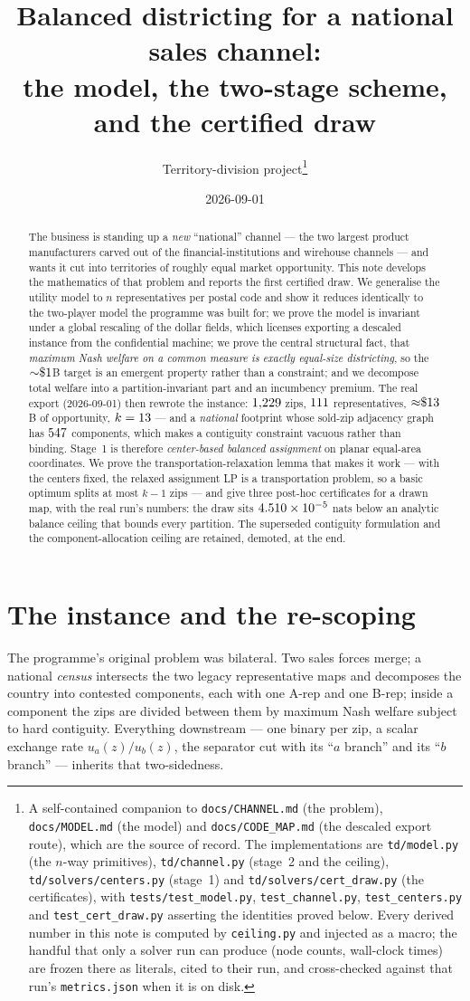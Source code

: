 \documentclass[11pt]{article}
\title{Balanced districting for a national sales channel:\\
the model, the two-stage scheme, and the certified draw}
\author{Territory-division project\thanks{A self-contained companion to
\texttt{docs/CHANNEL.md} (the problem), \texttt{docs/MODEL.md} (the model) and
\texttt{docs/CODE_MAP.md} (the descaled export route), which are the source of record. The
implementations are \texttt{td/model.py} (the $n$-way primitives), \texttt{td/channel.py}
(stage~2 and the ceiling), \texttt{td/solvers/centers.py} (stage~1) and
\texttt{td/solvers/cert\_draw.py} (the certificates), with \texttt{tests/test\_model.py},
\texttt{test\_channel.py}, \texttt{test\_centers.py} and \texttt{test\_cert\_draw.py}
asserting the identities proved below. Every derived number in this note is computed by
\texttt{ceiling.py} and injected as a macro; the handful that only a solver run can produce
(node counts, wall-clock times) are frozen there as literals, cited to their run, and
cross-checked against that run's \texttt{metrics.json} when it is on disk.}}
\date{2026-09-01}
\theoremstyle{definition}
\begin{document}
\maketitle

\begin{abstract}
\noindent
The business is standing up a \emph{new} ``national'' channel --- the two largest product
manufacturers carved out of the financial-institutions and wirehouse channels --- and wants
it cut into territories of roughly equal market opportunity. This note develops the
mathematics of that problem and reports the first certified draw. We generalise the utility
model to $n$ representatives per postal code and show it reduces identically to the
two-player model the programme was built for; we prove the model is invariant under a global
rescaling of the dollar fields, which licenses exporting a descaled instance from the
confidential machine; we prove the central structural fact, that \emph{maximum Nash welfare
on a common measure is exactly equal-size districting}, so the ${\sim}\$1$B target
is an emergent property rather than a constraint; and we decompose total welfare into a
partition-invariant part and an incumbency premium. The real export (2026-09-01) then
rewrote the instance: $1{,}229$ zips, $111$ representatives, ${\approx}\$13$B of
opportunity, $k=13$ --- and a \emph{national} footprint whose sold-zip adjacency
graph has $547$ components, which makes a contiguity constraint vacuous rather
than binding. Stage~1 is therefore \emph{center-based balanced assignment} on planar
equal-area coordinates. We prove the transportation-relaxation lemma that makes it work ---
with the centers fixed, the relaxed assignment LP is a transportation problem, so a basic
optimum splits at most $k-1$ zips --- and give three post-hoc certificates for a drawn map,
with the real run's numbers: the draw sits $4.510\times10^{-5}$ nats below an analytic balance
ceiling that bounds every partition. The superseded contiguity formulation and the
component-allocation ceiling are retained, demoted, at the end.
\end{abstract}

\section{The instance and the re-scoping}\label{sec:setup}

The programme's original problem was bilateral. Two sales forces merge; a national
\emph{census} intersects the two legacy representative maps and decomposes the country
into contested components, each with one A-rep and one B-rep; inside a component the zips
are divided between them by maximum Nash welfare subject to hard contiguity. Everything
downstream --- one binary per zip, a scalar exchange rate $u_a(z)/u_b(z)$, the separator
cut with its ``$a$ branch'' and its ``$b$ branch'' --- inherits that two-sidedness.
\end{document}
